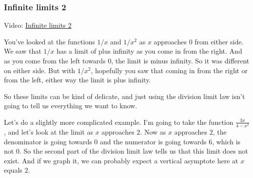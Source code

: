 \documentclass[pdftex, brazil, 12pt, twoside]{article}
\begin{document}
\subsubsection{Infinite limits 2}
\label{u0-lim-quo-inf2}

Video: \href{https://www.youtube.com/watch?v=VeAFeSbo7aQ}{Infinite limits 2}

You've looked at the functions $1/x$
and $1/x^2$ as $x$ approaches $0$ from either side.
We saw that $1/x$ has a limit of plus infinity
as you come in from the right.
And as you come from the left towards $0$,
the limit is minus infinity.
So it was different on either side.
But with $1/x^2$, hopefully
you saw that coming in from the right
or from the left, either way the limit is plus infinity.

\begin{figure}[H]
  \begin{center}
  \end{center}
\end{figure}

So these limits can be kind of delicate,
and just using the division limit law
isn't going to tell us everything we want to know.

Let's do a slightly more complicated example.
I'm going to take the function $\displaystyle \frac{3x}{4 - x^2}$,
and let's look at the limit as $x$ approaches $2$.
Now as $x$ approaches $2$, the denominator is going towards $0$
and the numerator is going towards $6$, which is not $0$.
So the second part of the division limit law
tells us that this limit does not exist.
And if we graph it, we can probably
expect a vertical asymptote here at $x$ equals $2$.
\end{document}
